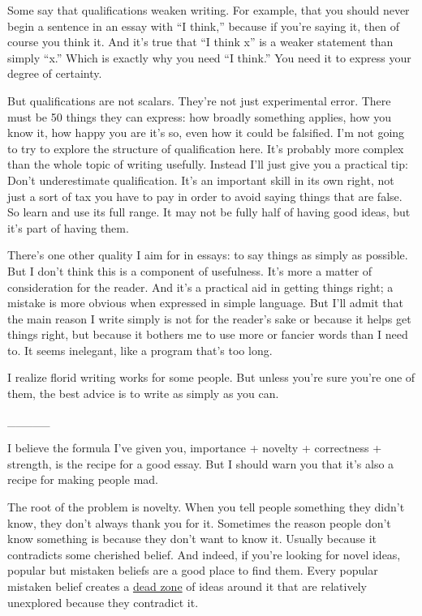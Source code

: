 Some say that qualifications weaken writing. For example, that you
should never begin a sentence in an essay with ``I think,'' because if
you're saying it, then of course you think it. And it's true that ``I
think x'' is a weaker statement than simply ``x.'' Which is exactly why
you need ``I think.'' You need it to express your degree of certainty.

But qualifications are not scalars. They're not just experimental error.
There must be 50 things they can express: how broadly something applies,
how you know it, how happy you are it's so, even how it could be
falsified. I'm not going to try to explore the structure of
qualification here. It's probably more complex than the whole topic of
writing usefully. Instead I'll just give you a practical tip: Don't
underestimate qualification. It's an important skill in its own right,
not just a sort of tax you have to pay in order to avoid saying things
that are false. So learn and use its full range. It may not be fully
half of having good ideas, but it's part of having them.

There's one other quality I aim for in essays: to say things as simply
as possible. But I don't think this is a component of usefulness. It's
more a matter of consideration for the reader. And it's a practical aid
in getting things right; a mistake is more obvious when expressed in
simple language. But I'll admit that the main reason I write simply is
not for the reader's sake or because it helps get things right, but
because it bothers me to use more or fancier words than I need to. It
seems inelegant, like a program that's too long.

I realize florid writing works for some people. But unless you're sure
you're one of them, the best advice is to write as simply as you can.

\_\_\_\_\_

I believe the formula I've given you, importance + novelty + correctness
+ strength, is the recipe for a good essay. But I should warn you that
it's also a recipe for making people mad.

The root of the problem is novelty. When you tell people something they
didn't know, they don't always thank you for it. Sometimes the reason
people don't know something is because they don't want to know it.
Usually because it contradicts some cherished belief. And indeed, if
you're looking for novel ideas, popular but mistaken beliefs are a good
place to find them. Every popular mistaken belief creates a
\href{nov.html}{dead zone} of ideas around it that are relatively
unexplored because they contradict it.

